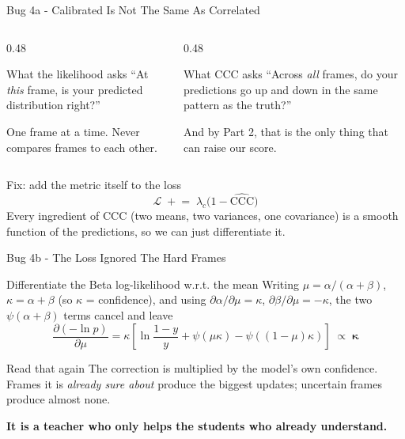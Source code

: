 \documentclass[aspectratio=169]{beamer}
\newcommand{\hl}[1]{\textcolor{coolpurple}{\textbf{#1}}}
\begin{document}
	\begin{frame}{Bug 4a - Calibrated Is Not The Same As Correlated}
		\begin{columns}[onlytextwidth]
			\begin{column}{0.48\textwidth}
				\begin{alertblock}{What the likelihood asks}
					\small
					``At \emph{this} frame, is your predicted distribution right?''
					\vspace{0.3em}

					One frame at a time. Never compares frames to each other.
				\end{alertblock}
			\end{column}
			\begin{column}{0.48\textwidth}
				\begin{block}{What CCC asks}
					\small
					``Across \emph{all} frames, do your predictions go up and down in the same
					pattern as the truth?''
					\vspace{0.3em}

					And by Part 2, that is the only thing that can raise our score.
				\end{block}
			\end{column}
		\end{columns}
		\vspace{0.5em}
		\begin{block}{Fix: add the metric itself to the loss}
			\small
			$$ \mathcal{L} \;\mathrel{+}=\; \lambda_c\bigl(1 - \widehat{\text{CCC}}\bigr) $$
			Every ingredient of CCC (two means, two variances, one covariance) is a smooth
			function of the predictions, so we can just differentiate it.
		\end{block}
	\end{frame}

	\begin{frame}{Bug 4b - The Loss Ignored The Hard Frames}
		\begin{block}{Differentiate the Beta log-likelihood w.r.t. the mean}
			\small
			Writing $\mu = \alpha/(\alpha+\beta)$, $\kappa = \alpha+\beta$ (so $\kappa$ = confidence),
			and using $\partial\alpha/\partial\mu = \kappa$, $\partial\beta/\partial\mu = -\kappa$,
			the two $\psi(\alpha{+}\beta)$ terms cancel and leave
			$$ \frac{\partial(-\ln p)}{\partial \mu}
			= \kappa\left[\ln\frac{1-y}{y} + \psi(\mu\kappa) - \psi((1-\mu)\kappa)\right]
			\;\propto\; \boldsymbol{\kappa} $$
		\end{block}
		\begin{alertblock}{Read that again}
			\small
			The correction is multiplied by the model's own confidence. Frames it is
			\emph{already sure about} produce the biggest updates; uncertain frames produce
			almost none.
			\vspace{0.3em}

			\hl{It is a teacher who only helps the students who already understand.}
		\end{alertblock}
	\end{frame}
\end{document}
